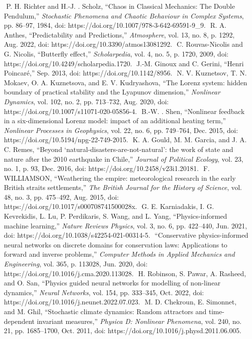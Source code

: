 \documentclass[conference]{IEEEtran}
\begin{document}
\begin{thebibliography}{00}
‌‌ P. H. Richter and H.-J. . Scholz, “Chaos in Classical Mechanics: The Double Pendulum,” \textit{Stochastic Phenomena and Chaotic Behaviour in Complex Systems}, pp. 86–97, 1984, doi: https://doi.org/10.1007/978-3-642-69591-9\_9.
‌‌ R. A. Anthes, “Predictability and Predictions,” \textit{Atmosphere}, vol. 13, no. 8, p. 1292, Aug. 2022, doi: https://doi.org/10.3390/atmos13081292.
‌‌‌ C. Rouvas-Nicolis and G. Nicolis, “Butterfly effect,” \textit{Scholarpedia}, vol. 4, no. 5, p. 1720, 2009, doi: https://doi.org/10.4249/scholarpedia.1720.
‌‌‌ J.-M. Ginoux and C. Gerini, “Henri Poincaré,” Sep. 2013, doi: https://doi.org/10.1142/8956.
‌‌‌ N. V. Kuznetsov, T. N. Mokaev, O. A. Kuznetsova, and E. V. Kudryashova, “The Lorenz system: hidden boundary of practical stability and the Lyapunov dimension,” \textit{Nonlinear Dynamics}, vol. 102, no. 2, pp. 713–732, Aug. 2020, doi: https://doi.org/10.1007/s11071-020-05856-4.
‌‌‌ B.-W. . Shen, “Nonlinear feedback in a six-dimensional Lorenz model: impact of an additional heating term,” \textit{Nonlinear Processes in Geophysics}, vol. 22, no. 6, pp. 749–764, Dec. 2015, doi: https://doi.org/10.5194/npg-22-749-2015.
‌‌‌ K. A. Gould, M. M. Garcia, and J. A. C. Remes, “Beyond ‘natural-disasters-are-not-natural’: the work of state and nature after the 2010 earthquake in Chile,” \textit{Journal of Political Ecology}, vol. 23, no. 1, p. 93, Dec. 2016, doi: https://doi.org/10.2458/v23i1.20181.
‌‌‌ F. WILLIAMSON, “Weathering the empire: meteorological research in the early British straits settlements,” \textit{The British Journal for the History of Science}, vol. 48, no. 3, pp. 475–492, Aug. 2015, doi: https://doi.org/10.1017/s000708741500028x.
‌‌‌ G. E. Karniadakis, I. G. Kevrekidis, L. Lu, P. Perdikaris, S. Wang, and L. Yang, “Physics-informed machine learning,” \textit{Nature Reviews Physics}, vol. 3, no. 6, pp. 422–440, Jun. 2021, doi: https://doi.org/10.1038/s42254-021-00314-5.
‌‌‌ “Conservative physics-informed neural networks on discrete domains for conservation laws: Applications to forward and inverse problems,” \textit{Computer Methods in Applied Mechanics and Engineering}, vol. 365, p. 113028, Jun. 2020, doi: https://doi.org/10.1016/j.cma.2020.113028.
‌‌‌ H. Robinson, S. Pawar, A. Rasheed, and O. San, “Physics guided neural networks for modelling of non-linear dynamics,” \textit{Neural Networks}, vol. 154, pp. 333–345, Oct. 2022, doi: https://doi.org/10.1016/j.neunet.2022.07.023.
‌‌‌ M. D. Chekroun, E. Simonnet, and M. Ghil, “Stochastic climate dynamics: Random attractors and time-dependent invariant measures,” \textit{Physica D: Nonlinear Phenomena}, vol. 240, no. 21, pp. 1685–1700, Oct. 2011, doi: https://doi.org/10.1016/j.physd.2011.06.005.

\end{thebibliography}
\end{document}

